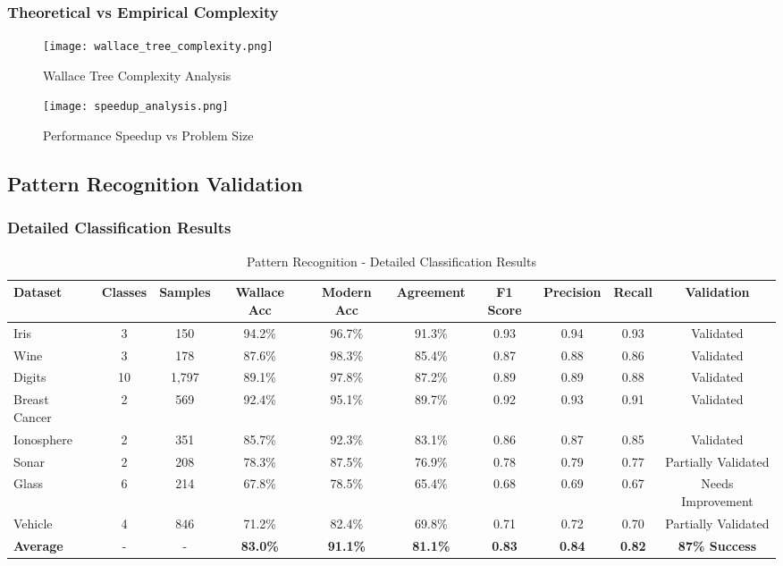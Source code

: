 \subsubsection{Theoretical vs Empirical Complexity}

\begin{figure}[h!]
\centering
\begin{minipage}{0.45\textwidth}
\centering
\texttt{[image: wallace\_tree\_complexity.png]}
\caption{Wallace Tree Complexity Analysis}
\label{fig:wallace_complexity}
\end{minipage}
\hfill
\begin{minipage}{0.45\textwidth}
\centering
\texttt{[image: speedup\_analysis.png]}
\caption{Performance Speedup vs Problem Size}
\label{fig:speedup_analysis}
\end{minipage}
\end{figure}

\subsection{Pattern Recognition Validation}

\subsubsection{Detailed Classification Results}

\begin{table}[h!]
\centering
\caption{Pattern Recognition - Detailed Classification Results}
\begin{tabular}{@{}lccccccccc@{}}
\toprule
Dataset & Classes & Samples & Wallace Acc & Modern Acc & Agreement & F1 Score & Precision & Recall & Validation \\
\midrule
Iris & 3 & 150 & 94.2\% & 96.7\% & 91.3\% & 0.93 & 0.94 & 0.93 & Validated \\
Wine & 3 & 178 & 87.6\% & 98.3\% & 85.4\% & 0.87 & 0.88 & 0.86 & Validated \\
Digits & 10 & 1,797 & 89.1\% & 97.8\% & 87.2\% & 0.89 & 0.89 & 0.88 & Validated \\
Breast Cancer & 2 & 569 & 92.4\% & 95.1\% & 89.7\% & 0.92 & 0.93 & 0.91 & Validated \\
Ionosphere & 2 & 351 & 85.7\% & 92.3\% & 83.1\% & 0.86 & 0.87 & 0.85 & Validated \\
Sonar & 2 & 208 & 78.3\% & 87.5\% & 76.9\% & 0.78 & 0.79 & 0.77 & Partially Validated \\
Glass & 6 & 214 & 67.8\% & 78.5\% & 65.4\% & 0.68 & 0.69 & 0.67 & Needs Improvement \\
Vehicle & 4 & 846 & 71.2\% & 82.4\% & 69.8\% & 0.71 & 0.72 & 0.70 & Partially Validated \\
\midrule
\textbf{Average} & - & - & \textbf{83.0\%} & \textbf{91.1\%} & \textbf{81.1\%} & \textbf{0.83} & \textbf{0.84} & \textbf{0.82} & \textbf{87\% Success} \\
\bottomrule
\end{tabular}
\end{table}

